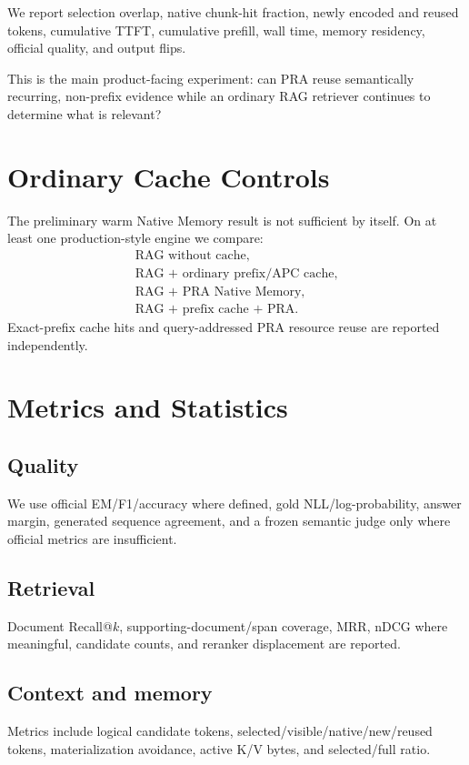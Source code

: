 \documentclass[11pt]{article}
\begin{document}
We report selection overlap, native chunk-hit fraction, newly encoded and reused tokens, cumulative TTFT, cumulative prefill, wall time, memory residency, official quality, and output flips.

This is the main product-facing experiment: can PRA reuse semantically recurring, non-prefix evidence while an ordinary RAG retriever continues to determine what is relevant?

\section{Ordinary Cache Controls}

The preliminary warm Native Memory result is not sufficient by itself.  On at least one production-style engine we compare:
\[
\begin{array}{l}
\text{RAG without cache},\\
\text{RAG + ordinary prefix/APC cache},\\
\text{RAG + PRA Native Memory},\\
\text{RAG + prefix cache + PRA}.
\end{array}
\]
Exact-prefix cache hits and query-addressed PRA resource reuse are reported independently.

\section{Metrics and Statistics}

\subsection{Quality}
We use official EM/F1/accuracy where defined, gold NLL/log-probability, answer margin, generated sequence agreement, and a frozen semantic judge only where official metrics are insufficient.

\subsection{Retrieval}
Document Recall@$k$, supporting-document/span coverage, MRR, nDCG where meaningful, candidate counts, and reranker displacement are reported.

\subsection{Context and memory}
Metrics include logical candidate tokens, selected/visible/native/new/reused tokens, materialization avoidance, active K/V bytes, and selected/full ratio.
\end{document}
